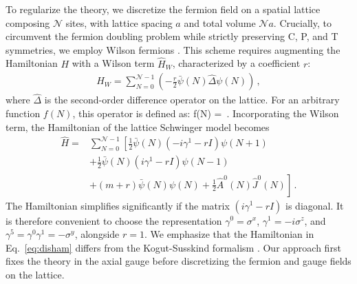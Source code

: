 \documentclass[aps,prd,twocolumn,superscriptaddress,notitlepage,nofootinbib,preprintnumbers]{revtex4-1}
\def\bea#1\eea{\begin{align}#1\end{align}}
\begin{document}
To regularize the theory, we discretize the fermion field on a spatial lattice composing $\mathcal{N}$ sites, with lattice spacing $a$ and total volume $\mathcal{N}a$. Crucially, to circumvent the fermion doubling problem while strictly preserving C, P, and T symmetries, we employ Wilson fermions \cite{Wilson:1974sk}. This scheme requires augmenting the Hamiltonian $H$ with a Wilson term $\hat{H}_W$, characterized by a coefficient $r$:
\begin{align}
    \hat{H}_W = \sum_{N=0}^{\mathcal{N}-1}
    \left(-\frac{r}{2} \bar{\psi}(N) \hat{\Delta} \psi(N)\right)\,,
\end{align}
where $\hat{\Delta}$ is the second-order difference operator on the lattice.
For an arbitrary function $f(N)$, this operator is defined as:
\bea\label{eq:latsd}
    \hat{\Delta} f(N) =  \left[f(N+1) + f(N-1) - 2f(N)\right]\,.
\eea
Incorporating the Wilson term, the Hamiltonian of the lattice Schwinger model becomes \begin{align}\label{eq:disham}
    \hat{H} =& \sum_{N=0}^{\mathcal{N}-1}\left[\frac{1}{2} \bar{\psi}(N) \left(-i\gamma^1-rI\right)\psi(N+1)\right.\nonumber\\
    &\left.+\frac{1}{2}\bar{\psi}(N)(i\gamma^1-rI)\psi(N-1)\right.\nonumber\\
    &\left.+(m+r)\bar\psi(N) \psi(N)+\frac{1}{2}\hat{A}^0(N)\hat{J}^0(N)\right]\,.
\end{align}
The Hamiltonian simplifies significantly if the matrix $(i\gamma^1-rI)$ is diagonal. It is therefore convenient to choose the representation $\gamma^0 = \sigma^x$, $\gamma^1 = -i \sigma^z$, and $\gamma^5 = \gamma^0\gamma^1 = -\sigma^y$, alongside $r=1$. We emphasize that the Hamiltonian in Eq.~\eqref{eq:disham} differs from the Kogut-Susskind formalism \cite{Kogut:1974ag}. Our approach first fixes the theory in the axial gauge before discretizing the fermion and gauge fields on the lattice.
\end{document}

